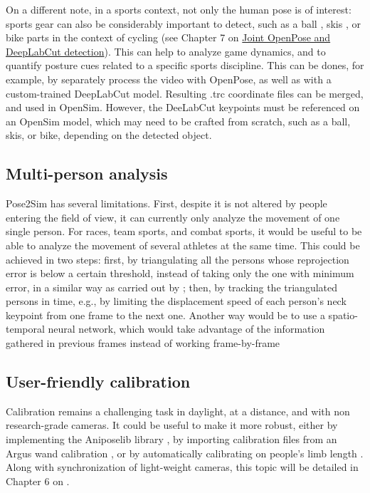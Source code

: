 On a different note, in a sports context, not only the human pose is of interest: sports gear can also be considerably important to detect, such as a ball \cite{Ghasemzadeh2021}, skis \cite{Ludwig2020}, or bike parts in the context of cycling (see Chapter 7 on \hyperref[ch:7]{Joint OpenPose and DeepLabCut detection}). This can help to analyze game dynamics, and to quantify posture cues related to a specific sports discipline. This can be dones, for example, by separately process the video with OpenPose, as well as with a custom-trained DeepLabCut model. Resulting .trc coordinate files can be merged, and used in OpenSim. However, the DeeLabCut keypoints must be referenced on an OpenSim model, which may need to be crafted from scratch, such as a ball, skis, or bike, depending on the detected object.


\subsection{Multi-person analysis}

Pose2Sim has several limitations. First, despite it is not altered by people entering the field of view, it can currently only analyze the movement of one single person. For races, team sports, and combat sports, it would be useful to be able to analyze the movement of several athletes at the same time. This could be achieved in two steps: first, by triangulating all the persons whose reprojection error is below a certain threshold, instead of taking only the one with minimum error, in a similar way as carried out by \cite{Slembrouck2020}; then, by tracking the triangulated persons in\clearpage
\noindent time, e.g., by limiting the displacement speed of each person’s neck keypoint from one frame to the next one. Another way would be to use a spatio-temporal neural network, which would take advantage of the information gathered in previous frames instead of working frame-by-frame \cite{Raaj2019}


\subsection{User-friendly calibration}

Calibration remains a challenging task in daylight, at a distance, and with non research-grade cameras. It could be useful to make it more robust, either by implementing the Aniposelib library \cite{Karashchuk2020}, by importing calibration files from an Argus wand calibration \cite{Argus2020}, or by automatically calibrating on people’s limb length \cite{Liu2022a}. Along with synchronization of light-weight cameras, this topic will be detailed in Chapter 6 on  \cite{Pagnon2022c}.



